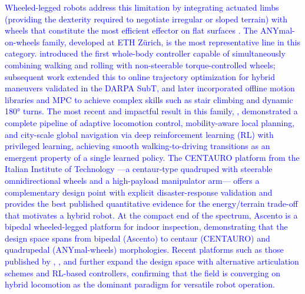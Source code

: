 \documentclass[preprint,12pt]{elsarticle}
\newcommand{\revblue}[1]{\textcolor{blue}{#1}}
\begin{document}
\revblue{Wheeled-legged robots address this limitation by integrating actuated limbs (providing the dexterity required to negotiate irregular or sloped terrain) with wheels that constitute the most efficient effector on flat surfaces \citep{Bjelonic2023Survey}. The ANYmal-on-wheels family, developed at ETH Z\"{u}rich, is the most representative line in this category. \citet{Bjelonic2019KeepRollin} introduced the first whole-body controller capable of simultaneously combining walking and rolling with non-steerable torque-controlled wheels; subsequent work \citep{bjelonic2019} extended this to online trajectory optimization for hybrid maneuvers validated in the DARPA SubT, and \citet{Bjelonic2022OfflineMotion} later incorporated offline motion libraries and MPC to achieve complex skills such as stair climbing and dynamic 180° turns. The most recent and impactful result in this family, \citet{Lee2024Science}, demonstrated a complete pipeline of adaptive locomotion control, mobility-aware local planning, and city-scale global navigation via deep reinforcement learning (RL) with privileged learning, achieving smooth walking-to-driving transitions as an emergent property of a single learned policy. The CENTAURO platform from the Italian Institute of Technology \citep{Kashiri2019CENTAURO,Klamt2019CENTAURO} ---a centaur-type quadruped with steerable omnidirectional wheels and a high-payload manipulator arm--- offers a complementary design point with explicit disaster-response validation and provides the best published quantitative evidence for the energy/terrain trade-off that motivates a hybrid robot. At the compact end of the spectrum, Ascento \citep{Klemm2019Ascento} is a bipedal wheeled-legged platform for indoor inspection, demonstrating that the design space spans from bipedal (Ascento) to centaur (CENTAURO) and quadrupedal (ANYmal-wheels) morphologies. Recent platforms such as those published by \citet{Liu2024Max},  \citet{Cui2025FLORES}, and \citet{Jiang2025RTaichi} further expand the design space with alternative articulation schemes and RL-based controllers, confirming that the field is converging on hybrid locomotion as the dominant paradigm for versatile robot operation.}
\end{document}
